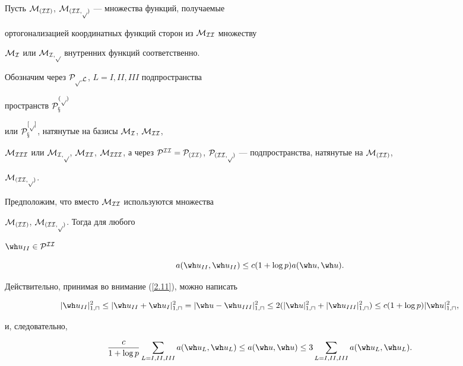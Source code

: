 




Пусть $\cal M_{(II)}$, $\cal M_{(II,p)}$ --- множества функций, получаемые


ортогонализацией координатных функций сторон из $\cal M_{II}$ множеству


$\cal M_{I}$ или $\cal M_{I,p}$ внутренних функций соответственно.


Обозначим через $\cal P_{p,L}$, $L=I,II,III$ подпространства


пространств $\cal P_x^{(p)}$


или $\cal P_x^{[p]}$, натянутые на базисы $\cal M_{I}$, $\cal M_{II}$,


$\m{III}$ или $\m{I,p}$, $\m{II}$, $\m{III}$, а через $\p^{II}=


\p_{(II)}$, $\p_{(II,p)}$ --- подпространства, натянутые на $\m{(II)}$,


$\cal M_{(II,p)}$.





\begin{notes}


Предположим, что вместо $\cal M_{II}$ используются множества


$\cal M_{(II)}$, $\cal M_{(II,p)}$. Тогда для любого


$\h_{II}\in\p^{II}$


$$


a(\h_{II},\h_{II})\le c(1+\log p)a(\h,\h).


$$


Действительно, принимая во внимание (\ref{2.11}), можно написать


$$


|\h_{II}|_{1,\sqcap}^2\le|\h_{II}+\h_{I}|_{1,\sqcap}^2=


|\h-\h_{III}|_{1,\sqcap}^2\le 2(|\h|_{1,\sqcap}^2+


|\h_{III}|_{1,\sqcap}^2)\le c(1+\log p)|\h|_{1,\sqcap}^2,


$$


и, следовательно,


$$


\frac{c}{1+\log p}\sum_{L=I,II,III}


a(\h_L,\h_L)\le a(\h,\h)\le


3\sum_{L=I,II,III}a(\h_L,\h_L).


$$


\end{notes}





